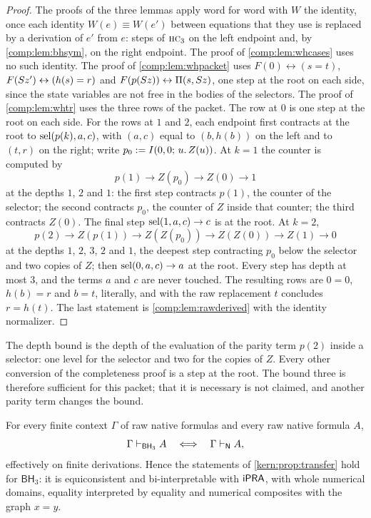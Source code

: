 \begin{proof}
The proofs of the three lemmas apply word for word with $W$ the identity,
once each identity $W(e)\equiv W(e')$ between equations that they use is
replaced by a derivation of $e'$ from $e$: steps of $\rulename{HC}_3$ on the
left endpoint and, by \cref{comp:lem:bhsym}, on the right endpoint. The proof
of \cref{comp:lem:whcases} uses no such identity. The proof of
\cref{comp:lem:whpacket} uses
$F(0)\leftrightarrow(s=t)$, $F(S z')\leftrightarrow(h(s)=r)$ and
$F(p(S z))\leftrightarrow\Pi(s,S z)$, one step at the root on each
side, since the state variables are not free in the bodies of the selectors.
The proof of \cref{comp:lem:whtr} uses the three rows of the packet. The row
at $0$ is one step at the root on each side. For the rows at $1$ and $2$,
each endpoint first contracts at the root to $\operatorname{sel}(p(k),a,c)$, with
$(a,c)$ equal to $(b,h(b))$ on the left and to $(t,r)$ on the right; write
$p_0\mathrel{:=}I(0,0;\,u.\,Z(u))$. At $k=1$ the counter is computed by
\[
 p(1)\to Z(p_0)\to Z(0)\to1
\]
at the depths $1$, $2$ and $1$: the first step contracts $p(1)$, the
counter of the selector; the second contracts $p_0$, the counter of $Z$
inside that counter; the third contracts $Z(0)$. The final step
$\operatorname{sel}(1,a,c)\to c$ is at the root. At $k=2$,
\[
 p(2)\to Z(p(1))\to Z(Z(p_0))\to Z(Z(0))\to Z(1)\to0
\]
at the depths $1$, $2$, $3$, $2$ and $1$, the deepest step contracting $p_0$
below the selector and two copies of $Z$; then $\operatorname{sel}(0,a,c)\to a$ at the
root. Every step has depth at most $3$, and the terms $a$ and $c$ are never
touched. The resulting rows are $0=0$, $h(b)=r$ and $b=t$, literally, and
 with the raw replacement $t$ concludes $r=h(t)$. The last
statement is \cref{comp:lem:rawderived} with the identity normalizer.
\end{proof}

The depth bound is the depth of the evaluation of the parity term $p(2)$
inside a selector: one level for the selector and two for the copies of $Z$.
Every other conversion of the completeness proof is a step at the root. The
bound three is therefore sufficient for this packet; that it is necessary is
not claimed, and another parity term changes the bound.

\begin{theorem}
\label{comp:thm:bh}
For every finite context $\Gamma$ of raw native formulas and every raw native
formula $A$,
\[
 \Gamma\vdash_{\mathsf{BH}_3}A
 \quad\Longleftrightarrow\quad
 \Gamma\vdash_{\mathsf{N}}A,
\]
effectively on finite derivations. Hence the statements of
\cref{kern:prop:transfer} hold for $\mathsf{BH}_3$: it is equiconsistent and
bi-interpretable with $\mathsf{iPRA}$, with whole numerical domains, equality
interpreted by equality and numerical composites with the graph $x=y$.
\end{theorem}

